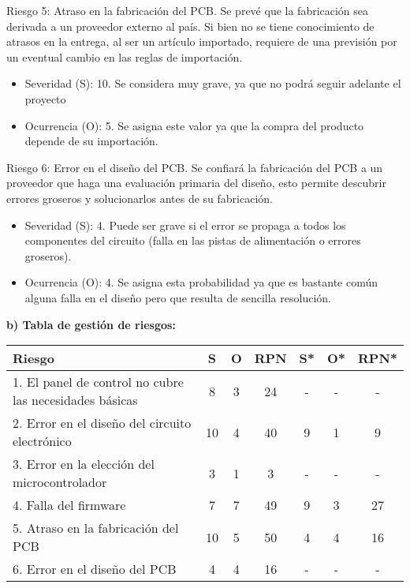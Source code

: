 Riesgo 5: Atraso en la fabricación del PCB. Se prevé que la fabricación sea derivada a un proveedor externo al país. Si bien no se tiene conocimiento de atrasos en la entrega, al ser un artículo importado, requiere de una previsión por un eventual cambio en las reglas de importación.
\begin{itemize}
\item Severidad (S): 10. Se considera muy grave, ya que no podrá seguir adelante el proyecto
\item Ocurrencia (O): 5. Se asigna este valor ya que la compra del producto depende de su importación.
\end{itemize}

Riesgo 6: Error en el diseño del PCB. Se confiará la fabricación del PCB a un proveedor que haga una evaluación primaria del diseño, esto permite descubrir errores groseros y solucionarlos antes de su fabricación.
\begin{itemize}
\item Severidad (S): 4. Puede ser grave si el error se propaga a todos los componentes del circuito (falla en las pistas de alimentación o errores groseros).
\item Ocurrencia (O): 4. Se asigna esta probabilidad ya que es bastante común alguna falla en el diseño pero que resulta de sencilla resolución.
\end{itemize}


\textbf{b) Tabla de gestión de riesgos:}

\begin{table}[htpb]
\centering
\begin{tabularx}{\linewidth}{@{}|X|c|c|c|c|c|c|@{}}
\hline
\rowcolor[HTML]{C0C0C0} 
Riesgo & S & O & RPN & S* & O* & RPN* \\ \hline
1. El panel de control no cubre las necesidades básicas & 8  & 3  &  \cellcolor[HTML]{7ab560}24   &   - &  -  &    -  \\ \hline
2. Error en el diseño del circuito electrónico &  10 &  4 & \cellcolor[HTML]{c94848} 40  &  9  &  1  &  \cellcolor[HTML]{7ab560}9 \\ \hline
3. Error en la elección del microcontrolador &  3 & 1  &   \cellcolor[HTML]{7ab560}3  &  -  &  -  &    -  \\ \hline
4. Falla del firmware & 7  & 7  &  \cellcolor[HTML]{c94848}49   &  9  & 3   & \cellcolor[HTML]{7ab560}27  \\ \hline
5. Atraso en la fabricación del PCB &  10 &  5 &  \cellcolor[HTML]{c94848}50   &  4  & 4   & \cellcolor[HTML]{7ab560}16  \\ \hline
6. Error en el diseño del PCB & 4  & 4  &   \cellcolor[HTML]{7ab560}16  &  -  &  - &   - \\ \hline
\end{tabularx}%
\end{table}

